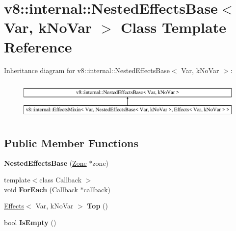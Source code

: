 \hypertarget{classv8_1_1internal_1_1_nested_effects_base}{}\section{v8\+:\+:internal\+:\+:Nested\+Effects\+Base$<$ Var, k\+No\+Var $>$ Class Template Reference}
\label{classv8_1_1internal_1_1_nested_effects_base}
Inheritance diagram for v8\+:\+:internal\+:\+:Nested\+Effects\+Base$<$ Var, k\+No\+Var $>$\+:\begin{figure}[H]
\begin{center}
\leavevmode
\includegraphics[height=2.000000cm]{classv8_1_1internal_1_1_nested_effects_base}
\end{center}
\end{figure}
\subsection*{Public Member Functions}
\begin{DoxyCompactItemize}
\item 
\hypertarget{classv8_1_1internal_1_1_nested_effects_base_a5280e7930014664034aee789369a9558}{}{\bfseries Nested\+Effects\+Base} (\hyperlink{classv8_1_1internal_1_1_zone}{Zone} $\ast$zone)\label{classv8_1_1internal_1_1_nested_effects_base_a5280e7930014664034aee789369a9558}

\item 
\hypertarget{classv8_1_1internal_1_1_nested_effects_base_a8be950e509a39725bdb942d8902f1b09}{}{\footnotesize template$<$class Callback $>$ }\\void {\bfseries For\+Each} (Callback $\ast$callback)\label{classv8_1_1internal_1_1_nested_effects_base_a8be950e509a39725bdb942d8902f1b09}

\item 
\hypertarget{classv8_1_1internal_1_1_nested_effects_base_a037b86188bb26d23e264c91d074b800a}{}\hyperlink{classv8_1_1internal_1_1_effects}{Effects}$<$ Var, k\+No\+Var $>$ {\bfseries Top} ()\label{classv8_1_1internal_1_1_nested_effects_base_a037b86188bb26d23e264c91d074b800a}

\item 
\hypertarget{classv8_1_1internal_1_1_nested_effects_base_a805770a584d96515ed8153ae8a8a1ec7}{}bool {\bfseries Is\+Empty} ()\label{classv8_1_1internal_1_1_nested_effects_base_a805770a584d96515ed8153ae8a8a1ec7}

\end{DoxyCompactItemize}
